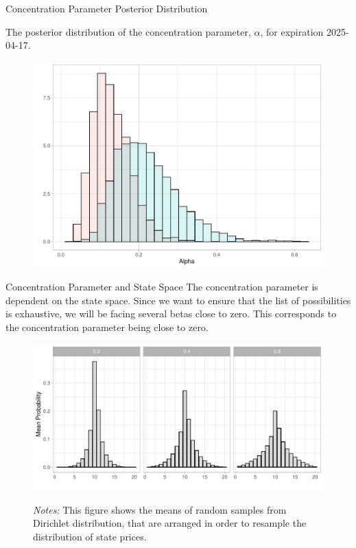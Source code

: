 \documentclass[10pt,aspectratio=43]{beamer}
\begin{document}
\begin{frame}{Concentration Parameter Posterior Distribution}
    
    The posterior distribution of the concentration parameter, $\alpha$, for expiration 2025-04-17.
\begin{figure}
    \begin{minipage}{0.9\linewidth}
        \centering
        \includegraphics[width=0.8\linewidth]{alpha_histogram.pdf}
    \end{minipage}
\end{figure}
\end{frame}

\begin{frame}{Concentration Parameter and State Space}
    The concentration parameter is dependent on the state space. Since we want to ensure that the list of possibilities is exhaustive, we will be facing several betas close to zero. This corresponds to the concentration parameter being close to zero.
    \begin{figure}[htbp]
    \begin{minipage}{0.9\linewidth}
        \centering
        \includegraphics[width=\linewidth]{dirichlet_histogram.pdf}
        \vspace{-6ex}
        \begin{flushleft}
        \tiny \textit{Notes:} This figure shows the means of random samples from Dirichlet distribution, that are arranged in order to resample the distribution of state prices.
        \end{flushleft}
    \end{minipage}
      \end{figure}
\end{frame}
\end{document}
